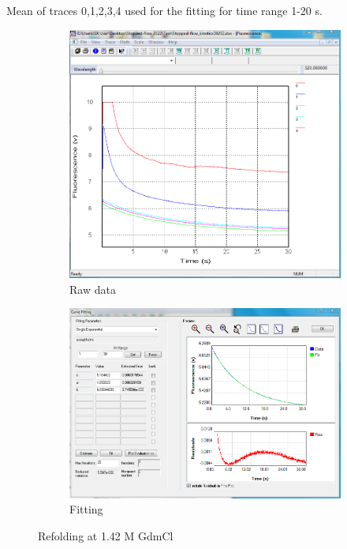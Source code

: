 \documentclass[a4paper,english,12pt,bibliography=totoc]{scrreprt}
\begin{document}
Mean of traces 0,1,2,3,4 used for the fitting for time range 1-20 s.
\begin{figure}[H]
    \centering
    \begin{subfigure}[b]{0.45\textwidth}
        \centering
        \includegraphics[width=\textwidth]{Images/G8/rf2_raw.PNG}
        \caption{Raw data }
        \label{fig:sub1}
    \end{subfigure}
    \hspace{0cm} %
    \begin{subfigure}[b]{0.45\textwidth}
        \centering
        \includegraphics[width=\textwidth]{Images/G8/rf2_fitting.PNG}
        \caption{Fitting}
        \label{fig:sub2}
    \end{subfigure}
    \caption{Refolding at  1.42 M GdmCl }
    \label{fig:main}
\end{figure}
\end{document}
